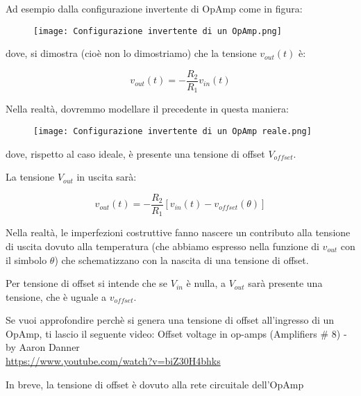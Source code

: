 Ad esempio dalla configurazione invertente di OpAmp come in figura: 

\begin{figure}[h]
    \centering
    \texttt{[image: Configurazione invertente di un OpAmp.png]}
\end{figure}

dove, si dimostra (cioè non lo dimostriamo) che la tensione $v_{out} (t)$ è: 

{
    \Large 
    \begin{equation}
        v_{out} (t) = - \frac{R_2}{R_1} v_{in} (t)
    \end{equation}
}

Nella realtà, dovremmo modellare il precedente in questa maniera: 

\begin{figure}[h]
    \centering
    \texttt{[image: Configurazione invertente di un OpAmp reale.png]}
\end{figure}

\newpage 

dove, rispetto al caso ideale, è presente una tensione di offset $V_{offset}$. \newline 

La tensione $V_{out}$ in uscita sarà: 

{
    \Large 
    \begin{equation}
        v_{out} (t) = - \frac{R_2}{R_1} 
        \left[ v_{in} (t) - v_{offset} (\theta) \right]
    \end{equation}
}

Nella realtà, le imperfezioni costruttive fanno nascere un contributo alla tensione di uscita dovuto alla temperatura (che abbiamo espresso nella funzione di $v_{out}$ con il simbolo $\theta$) 
che schematizzano con la nascita di una tensione di offset. \newline 

Per tensione di offset si intende che se $V_{in}$ è nulla, a $V_{out}$ sarà presente una tensione, che è uguale a $v_{offset}$. \newline 

\begin{tcolorbox}
    Se vuoi approfondire perchè si genera una tensione di offset all'ingresso di un OpAmp, ti lascio il seguente video: \newline 
    Offset voltage in op-amps (Amplifiers \# 8) - by Aaron Danner \\ \url{https://www.youtube.com/watch?v=biZ30H4bhks} \newline 

    In breve, la tensione di offset è dovuto alla rete circuitale dell'OpAmp
\end{tcolorbox}

